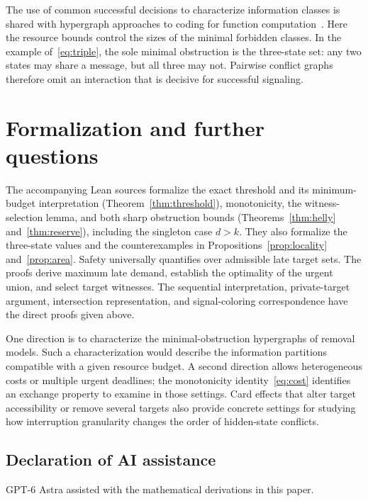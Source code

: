 \documentclass[11pt,a4paper]{amsart}
\theoremstyle{definition}
\theoremstyle{remark}
\begin{document}
The use of common successful decisions to characterize information
classes is shared with hypergraph approaches to coding for function
computation~\cite{yuan}. Here the resource bounds control the sizes of
the minimal forbidden classes. In the example of~\eqref{eq:triple},
the sole minimal obstruction is the three-state set: any two states
may share a message, but all three may not. Pairwise conflict graphs
therefore omit an interaction that is decisive for successful signaling.

\section{Formalization and further questions}

The accompanying Lean sources formalize the exact threshold and its
minimum-budget interpretation (Theorem~\ref{thm:threshold}), monotonicity,
the witness-selection lemma, and both sharp obstruction bounds
(Theorems~\ref{thm:helly} and~\ref{thm:reserve}), including the singleton
case $d>k$. They also formalize the three-state values and the counterexamples
in Propositions~\ref{prop:locality} and~\ref{prop:area}. Safety universally
quantifies over admissible late target sets. The proofs derive maximum
late demand, establish the optimality of the urgent union, and select
target witnesses. The sequential interpretation, private-target argument,
intersection representation, and signal-coloring correspondence have the
direct proofs given above.

One direction is to characterize the minimal-obstruction hypergraphs of
removal models. Such a characterization
would describe the information partitions compatible with a given resource
budget. A second direction allows heterogeneous costs or multiple urgent
deadlines; the monotonicity identity~\eqref{eq:cost} identifies an exchange
property to examine in those settings. Card effects that alter target
accessibility or remove several targets also provide concrete settings for
studying how interruption granularity changes the order of hidden-state conflicts.

\subsection*{Declaration of AI assistance}
GPT-6 Astra assisted with the mathematical derivations in this paper.
\end{document}
